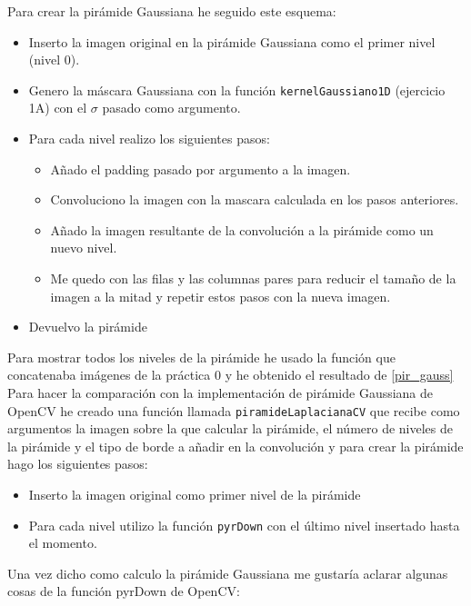 \documentclass[12pt,spanish]{article}
\begin{document}
Para crear la pirámide Gaussiana he seguido este esquema:

\begin{itemize}
	\item Inserto la imagen original en la pirámide Gaussiana como el primer nivel (nivel 0).
	\item Genero la máscara Gaussiana con la función \texttt{kernelGaussiano1D} (ejercicio 1A) con el $\sigma$ pasado como argumento.
	\item Para cada nivel realizo los siguientes pasos:
		\begin{itemize}
			\item Añado el padding pasado por argumento a la imagen.
			\item Convoluciono la imagen con la mascara calculada en los pasos anteriores.
			\item Añado la imagen resultante de la convolución a la pirámide como un nuevo nivel.
			\item Me quedo con las filas y las columnas pares para reducir el tamaño de la imagen a la mitad y repetir estos pasos con la nueva imagen.
		\end{itemize}
		
	\item Devuelvo la pirámide
\end{itemize}

Para mostrar todos los niveles de la pirámide he usado la función que concatenaba imágenes de la práctica 0 y he obtenido el resultado de \ref{pir_gauss}\\


Para hacer la comparación con la implementación de pirámide Gaussiana de OpenCV he creado una función llamada \texttt{piramideLaplacianaCV} que recibe como argumentos la imagen sobre la que calcular la pirámide, el número de niveles de la pirámide y el tipo de borde a añadir en la convolución y para crear la pirámide hago los siguientes pasos:

\begin{itemize}
	\item Inserto la imagen original como primer nivel de la pirámide
	\item Para cada nivel utilizo la función \texttt{pyrDown} con el último nivel insertado hasta el momento.
\end{itemize}

Una vez dicho como calculo la pirámide Gaussiana me gustaría aclarar algunas cosas de la función pyrDown de OpenCV:
\end{document}
